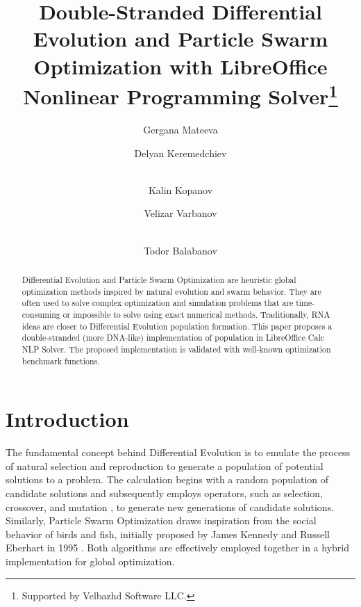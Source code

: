 \documentclass[runningheads]{llncs}
\begin{document}
\title{Double-Stranded Differential Evolution and Particle Swarm Optimization with LibreOffice Nonlinear Programming Solver\thanks{Supported by Velbazhd Software LLC.}}


\author{
Gergana Mateeva \and
Delyan Keremedchiev \and\\
Kalin Kopanov \and
Velizar Varbanov \and\\
Todor Balabanov
}



\maketitle

\begin{abstract}
Differential Evolution and Particle Swarm Optimization are heuristic global optimization methods inspired by natural evolution and swarm behavior. They are often used to solve complex optimization and simulation problems that are time-consuming or impossible to solve using exact numerical methods. Traditionally, RNA ideas are closer to Differential Evolution population formation. This paper proposes a double-stranded (more DNA-like) implementation of population in LibreOffice Calc NLP Solver. The proposed implementation is validated with well-known optimization benchmark functions.

\end{abstract}

\section{Introduction}

The fundamental concept behind Differential Evolution is to emulate the process of natural selection and reproduction to generate a population of potential solutions to a problem. The calculation begins with a random population of candidate solutions and subsequently employs operators, such as selection, crossover, and mutation \cite{Lambora-2019}, to generate new generations of candidate solutions. Similarly, Particle Swarm Optimization draws inspiration from the social behavior of birds and fish, initially proposed by James Kennedy and Russell Eberhart in 1995 \cite{Kennedy-1995}. Both algorithms are effectively employed together in a hybrid implementation for global optimization.
\end{document}
